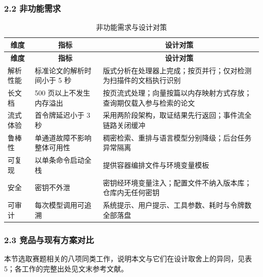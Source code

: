 \documentclass[UTF8,fontset=windows,zihao=5,a4paper]{ctexart}
\begin{document}
\subsubsection*{2.2 非功能需求}
\begin{longtable}{@{}p{}p{}p{}@{}}
\caption{非功能需求与设计对策}\\
\toprule
\multicolumn{1}{c}{\textbf{维度}} & \multicolumn{1}{c}{\textbf{指标}} & \multicolumn{1}{c}{\textbf{设计对策}} \\
\midrule
\endfirsthead
\toprule
\multicolumn{1}{c}{\textbf{维度}} & \multicolumn{1}{c}{\textbf{指标}} & \multicolumn{1}{c}{\textbf{设计对策}} \\
\midrule
\endhead
\bottomrule
\endfoot
解析性能 & 标准论文的解析时间小于 5 秒 & 版式分析在处理器上完成；按页并行；仅对检测为扫描件的文档执行识别 \\
长文档 & 500 页以上不发生内存溢出 & 按页流式处理；向量按篇以内存映射方式存放；查询期仅载入参与检索的论文 \\
流式体验 & 首令牌延迟小于 3 秒 & 采用两阶段架构，取证结果先行返回；事件流全链路关闭缓冲 \\
鲁棒性 & 单通道故障不影响整体可用性 & 稠密检索、重排与语言模型分别降级；后台任务异常隔离 \\
可复现 & 以单条命令启动全栈 & 提供容器编排文件与环境变量模板 \\
安全 & 密钥不外泄 & 密钥经环境变量注入；配置文件不纳入版本库；仓库内无任何密钥 \\
可审计 & 每次模型调用可追溯 & 系统提示、用户提示、工具参数、耗时与令牌数全部落盘 \\
\end{longtable}

\subsubsection*{2.3 竞品与现有方案对比}
本节选取赛题相关的八项同类工作，说明本文与它们在设计取舍上的异同，见表 5；各工作的完整出处见文末参考文献。
\end{document}
